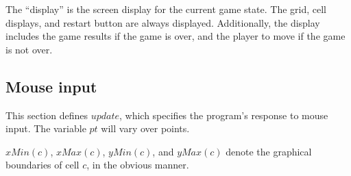 \documentclass{led_doc}
\begin{document}
\begin{ledCmnt}
The ``display'' is the screen display for the current game state. The grid, cell
displays, and restart button are always displayed. Additionally, the display includes
the game results if the game is over, and the player to move if the game is not over.
\end{ledCmnt}

\begin{ledDef}
\end{ledDef}

\begin{ledCmnt}
\section{Mouse input}

This section defines $update$, which specifies the program's response to mouse
input. The variable $pt$ will vary over points.

$xMin(c)$, $xMax(c)$, $yMin(c)$, and $yMax(c)$ denote the graphical boundaries of
cell $c$, in the obvious manner.
\end{ledCmnt}

\begin{ledDef}
\end{ledDef}

\begin{ledDef}
\end{ledDef}

\begin{ledDef}
\end{ledDef}

\begin{ledDef}
\end{ledDef}
\end{document}
